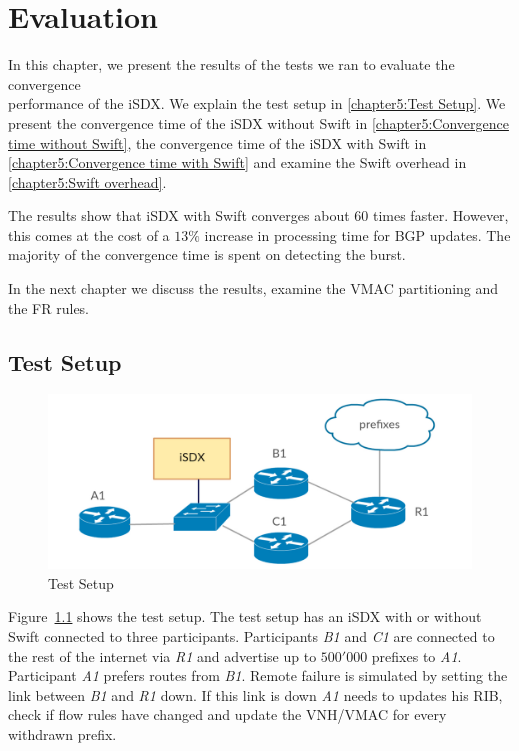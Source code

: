 \chapter{\label{chapter5}Evaluation}

In this chapter, we present the results of the tests we ran to evaluate the convergence \\performance of the iSDX. We explain the test setup in \ref{chapter5:Test Setup}. We present the convergence time of the iSDX without Swift in \ref{chapter5:Convergence time without Swift}, the convergence time of the iSDX with Swift in \ref{chapter5:Convergence time with Swift} and examine the Swift overhead in \ref{chapter5:Swift overhead}.

The results show that iSDX with Swift converges about $60$ times faster. However, this comes at the cost of a $13\%$ increase in processing time for BGP updates. The majority of the convergence time is spent on detecting the burst.

In the next chapter we discuss the results, examine the VMAC partitioning and the FR rules.

\section{\label{chapter5:Test Setup}Test Setup}

\begin{figure}[h]
\center
\includegraphics[scale = 0.36]{Figures/eval_exp_setup.pdf}
\caption{Test Setup}
\label{fig:test-setup}
\end{figure}

Figure~\ref{fig:test-setup} shows the test setup.
The test setup has an iSDX with or without Swift connected to three participants. Participants \emph{B1} and \emph{C1} are connected to the rest of the internet via \emph{R1} and advertise up to $500'000$ prefixes to \emph{A1}. Participant \emph{A1} prefers routes from \emph{B1}. Remote failure is simulated by setting the link between \emph{B1} and \emph{R1} down. If this link is down \emph{A1} needs to updates his RIB, check if flow rules have changed and update the VNH/VMAC for every withdrawn prefix.

